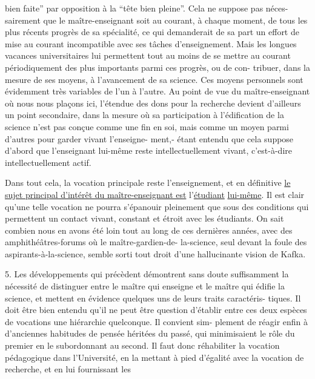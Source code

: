 
bien faite'' par opposition à la ``tête bien pleine''. Cela ne suppose pas néces-%
sairement que le maître-enseignant soit au courant, à chaque moment, de tous
les plus récents progrès de sa spécialité, ce qui demanderait de sa part un
effort de mise au courant incompatible avec ses tâches d'enseignement. Mais
les longues vacances universitaires lui permettent tout au moins de se mettre
au courant périodiquement des plus importants parmi ces progrès, ou de con-%
tribuer, dans la mesure de ses moyens, à l'avancement de sa science. Ces
moyens personnels sont évidemment très variables de l'un à l'autre. Au point
de vue du maître-enseignant où nous nous plaçons ici, l'étendue des dons pour
la recherche devient d'ailleurs un point secondaire, dans la mesure où sa
participation à l'édification de la science n'est pas conçue comme une fin
en soi, mais comme un moyen parmi d'autres pour garder vivant l'enseigne-%
ment,- étant entendu que cela suppose d'abord que l'enseignant lui-même reste
intellectuellement vivant, c'est-à-dire intellectuellement actif.

Dans tout cela, la vocation principale reste l'enseignement, et en
définitive \uline{le sujet principal d'intérêt du maître-enseignant est} l'\uline{étudiant}
\uline{lui-même}. Il est clair qu'une telle vocation ne pourra s'épanouir pleinement
que sous des conditions qui permettent un contact vivant, constant et étroit
avec les étudiants. On sait combien nous en avons été loin tout au long de
ces dernières années, avec des amphithéâtres-forums où le maître-gardien-de-%
la-science, seul devant la foule des aspirants-à-la-science, semble sorti
tout droit d'une hallucinante vision de Kafka.

5. Les développements qui précèdent démontrent sans doute suffisamment la
nécessité de distinguer  entre le maître qui enseigne et le maître qui édifie
la science, et mettent en évidence quelques uns de leurs traits caractéris-%
tiques. Il doit être bien entendu qu'il ne peut être question d'établir entre
ces deux espèces de vocations une hiérarchie quelconque. Il convient sim-%
plement de réagir enfin à d'anciennes habitudes de pensée héritées du passé,
qui minimisaient le rôle du premier en le subordonnant au second. Il faut
donc réhabiliter la vocation pédagogique dans l'Université, en la mettant
à pied d'égalité avec la vocation de recherche, et en lui fournissant les

